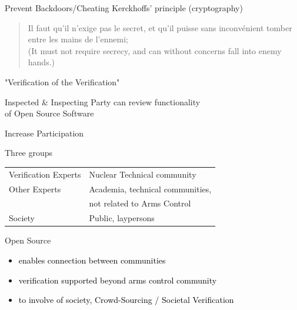 \documentclass[presentation]{beamer}
\begin{document}
\begin{frame}[label=sec-3-5]{}
\end{frame}


\begin{frame}[label=sec-3-6]{Prevent Backdoors/Cheating}
Kerckhoffs' principle (cryptography)

\begin{quote} %
Il faut qu’il n’exige pas le secret, et qu’il puisse sans inconvénient tomber entre les mains de l’ennemi;\\[0.3em]

\footnotesize (It must not require secrecy, and can without concerns fall into enemy hands.)

\vskip1mm \hspace*{}
\end{quote}



\vfill

\begin{block}{"Verification of the Verification"}
\begin{center}
Inspected \& Inspecting Party can review functionality\\ of Open Source Software
\end{center}
\end{block}
\end{frame}

\begin{frame}[label=sec-3-7]{Increase Participation}
\begin{block}{Three groups}
\begin{tabular}{ll}
\alert{Verification Experts} & Nuclear Technical community\\
\alert{Other Experts} & Academia, technical communities, \\
& not related to Arms Control \\
\alert{Society} & Public, laypersons \\
\end{tabular}
\end{block}

\begin{block}{Open Source}
\begin{itemize}
\item \textcolor{black}{enables connection between communities}
\item \textcolor{black}{verification supported beyond arms control community}
\item \textcolor{black}{to involve of society, Crowd-Sourcing / Societal Verification}
\end{itemize}
\end{block}
\end{frame}
\end{document}
